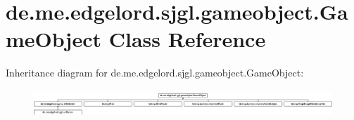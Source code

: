 \hypertarget{classde_1_1me_1_1edgelord_1_1sjgl_1_1gameobject_1_1_game_object}{}\section{de.\+me.\+edgelord.\+sjgl.\+gameobject.\+Game\+Object Class Reference}
\label{classde_1_1me_1_1edgelord_1_1sjgl_1_1gameobject_1_1_game_object}
Inheritance diagram for de.\+me.\+edgelord.\+sjgl.\+gameobject.\+Game\+Object\+:\begin{figure}[H]
\begin{center}
\leavevmode
\includegraphics[height=1.029412cm]{classde_1_1me_1_1edgelord_1_1sjgl_1_1gameobject_1_1_game_object}
\end{center}
\end{figure}
